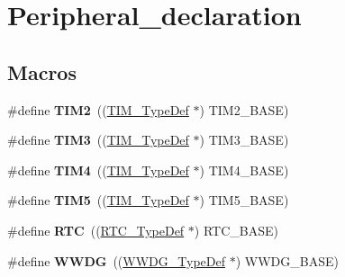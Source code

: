 \hypertarget{group___peripheral__declaration}{}\section{Peripheral\+\_\+declaration}
\label{group___peripheral__declaration}
\subsection*{Macros}
\begin{DoxyCompactItemize}
\item 
\mbox{\label{group___peripheral__declaration_ga3cfac9f2e43673f790f8668d48b4b92b}} 
\#define {\bfseries T\+I\+M2}~((\hyperlink{struct_t_i_m___type_def}{T\+I\+M\+\_\+\+Type\+Def} $\ast$) T\+I\+M2\+\_\+\+B\+A\+SE)
\item 
\mbox{\label{group___peripheral__declaration_ga61ee4c391385607d7af432b63905fcc9}} 
\#define {\bfseries T\+I\+M3}~((\hyperlink{struct_t_i_m___type_def}{T\+I\+M\+\_\+\+Type\+Def} $\ast$) T\+I\+M3\+\_\+\+B\+A\+SE)
\item 
\mbox{\label{group___peripheral__declaration_ga91a09bad8bdc7a1cb3d85cf49c94c8ec}} 
\#define {\bfseries T\+I\+M4}~((\hyperlink{struct_t_i_m___type_def}{T\+I\+M\+\_\+\+Type\+Def} $\ast$) T\+I\+M4\+\_\+\+B\+A\+SE)
\item 
\mbox{\label{group___peripheral__declaration_ga5125ff6a23a2ed66e2e19bd196128c14}} 
\#define {\bfseries T\+I\+M5}~((\hyperlink{struct_t_i_m___type_def}{T\+I\+M\+\_\+\+Type\+Def} $\ast$) T\+I\+M5\+\_\+\+B\+A\+SE)
\item 
\mbox{\label{group___peripheral__declaration_ga5359a088f5d8b20ce74d920e46059304}} 
\#define {\bfseries R\+TC}~((\hyperlink{struct_r_t_c___type_def}{R\+T\+C\+\_\+\+Type\+Def} $\ast$) R\+T\+C\+\_\+\+B\+A\+SE)
\item 
\mbox{\label{group___peripheral__declaration_ga9821fd01757986612ddb8982e2fe27f1}} 
\#define {\bfseries W\+W\+DG}~((\hyperlink{struct_w_w_d_g___type_def}{W\+W\+D\+G\+\_\+\+Type\+Def} $\ast$) W\+W\+D\+G\+\_\+\+B\+A\+SE)

\end{DoxyCompactItemize}
